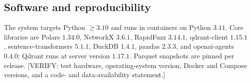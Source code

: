 \subsection*{Software and reproducibility}

The system targets Python $\geq 3.10$ and runs in containers on Python $3.11$. Core libraries are Polars $1.34.0$, NetworkX $3.6.1$, RapidFuzz $3.14.1$, qdrant-client $1.15.1$, sentence-transformers $5.1.1$, DuckDB $1.4.1$, pandas $2.3.3$, and openai-agents $0.4.0$; Qdrant runs at server version $1.17.1$. Parquet snapshots are pinned per release. [VERIFY: test hardware, operating-system version, Docker and Compose versions, and a code- and data-availability statement.]


